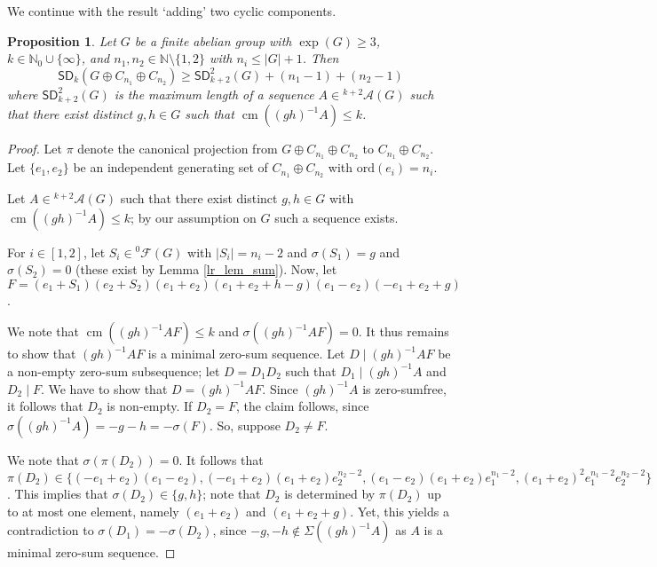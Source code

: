 \documentclass{amsart}
\newtheorem{pro}[thm]{Proposition}
\theoremstyle{definition}
\numberwithin{equation}{section}
\begin{document}
We continue with the result `adding' two cyclic components.

\begin{pro}
\label{pro_cn3}
Let $G$ be a finite abelian group with $\exp(G)\ge 3$, $k \in \mathbb{N}_0 \cup \{\infty\}$,
and $n_1,n_2 \in \mathbb{N}\setminus \{1,2\}$ with $n_i \le |G|+1$.
Then
\[
{\mathsf{SD}}_k(G \oplus C_{n_1}\oplus C_{n_2})\ge {\mathsf{SD}}_{k+2}^{2}(G)+(n_1-1)+(n_2-1)
\]
where ${\mathsf{SD}}_{k+2}^{2}(G)$ is the maximum length of a sequence $A\in {{}^{{k+2}}\!\mathcal{A}}(G)$ such that there exist distinct $g,h\in G$ such that $\operatorname{cm}((gh)^{-1}A)\le k$.\end{pro}
\begin{proof}
Let $\pi$ denote the canonical projection
from $G \oplus C_{n_1}\oplus C_{n_2}$ to $C_{n_1}\oplus C_{n_2}$.
Let $\{e_1, e_2\}$ be an independent generating set of $C_{n_1}\oplus C_{n_2}$ with ${\mathrm{ord}}(e_i) = n_i$.

Let $A\in {{}^{{k+2}}\!\mathcal{A}}(G)$ such that there exist distinct $g,h\in G$ with $\operatorname{cm}((gh)^{-1}A)\le k$; by our assumption on $G$ such a sequence exists.

For $i \in [1,2]$, let $S_i \in {{}^{{0}}\!\mathcal{F}}(G)$ with $|S_i|= n_i-2$ and $\sigma(S_1)=g$ and $\sigma(S_2)=0$ (these exist by Lemma \ref{lr_lem_sum}).
Now, let $F = (e_1+S_1)(e_2+S_2)(e_1+e_2)(e_1+e_2+h-g)(e_1-e_2)(-e_1+e_2+g)$.

We note that $\operatorname{cm}((gh)^{-1}AF)\le k$ and $\sigma((gh)^{-1}AF)= 0$.
It thus remains to show that $(gh)^{-1}AF$ is a minimal zero-sum sequence.
Let $D \mid (gh)^{-1}AF$ be a non-empty zero-sum subsequence;
let $D=D_1D_2$ such that $D_1 \mid (gh)^{-1}A$ and $D_2 \mid F$.
We have to show that $D=(gh)^{-1}AF$.
Since $(gh)^{-1}A$ is zero-sumfree, it follows that $D_2$ is non-empty. If $D_2=F$, the claim follows,
since $\sigma((gh)^{-1}A)= -g-h = - \sigma(F)$. So, suppose $D_2 \neq F$.

We note that $\sigma(\pi(D_2))=0$.
It follows that $\pi(D_2) \in \{ (-e_1+e_2)(e_1-e_2), (-e_1+e_2)(e_1+e_2)e_2^{n_2-2}, (e_1-e_2)(e_1+e_2) e_1^{n_1-2},
(e_1+e_2)^2 e_1^{n_1 - 2} e_2^{n_2 - 2}\}$.
This implies that $\sigma(D_2) \in \{g, h\}$; note that $D_2$ is determined by $\pi(D_2)$ up to
at most one element, namely $(e_1+e_2)$ and $(e_1+e_2+g)$.
Yet, this yields a contradiction to $\sigma(D_1)= - \sigma(D_2)$, since $-g,-h\notin \Sigma((gh)^{-1}A)$ as $A$ is a minimal zero-sum sequence.
\end{proof}
\end{document}
